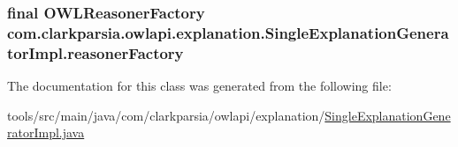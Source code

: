 \hypertarget{classcom_1_1clarkparsia_1_1owlapi_1_1explanation_1_1_single_explanation_generator_impl_a2eacc90779bb1e8895675560a1d3b57a}{
\subsubsection[{reasoner\-Factory}]{\setlength{\rightskip}{0pt plus 5cm}final {\bf O\-W\-L\-Reasoner\-Factory} com.\-clarkparsia.\-owlapi.\-explanation.\-Single\-Explanation\-Generator\-Impl.\-reasoner\-Factory\hspace{0.3cm}{\ttfamily [private]}}}\label{classcom_1_1clarkparsia_1_1owlapi_1_1explanation_1_1_single_explanation_generator_impl_a2eacc90779bb1e8895675560a1d3b57a}


The documentation for this class was generated from the following file\-:\begin{DoxyCompactItemize}
\item 
tools/src/main/java/com/clarkparsia/owlapi/explanation/\hyperlink{_single_explanation_generator_impl_8java}{Single\-Explanation\-Generator\-Impl.\-java}\end{DoxyCompactItemize}

